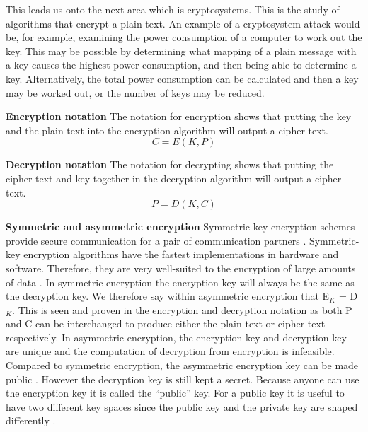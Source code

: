 \documentclass[11pt,a4paper, notitlepage]{report}
\begin{document}
This leads us onto the next area which is cryptosystems. This is the study of algorithms that encrypt a plain text. An example of a cryptosystem attack would be, for example, examining the power consumption of a computer to work out the key. This may be possible by determining what mapping of a plain message with a key causes the highest power consumption, and then being able to determine a key. Alternatively, the total power consumption can be calculated and then a key may be worked out, or the number of keys may be reduced.    \newline


\textbf{Encryption notation} \newline
The notation for encryption shows that putting the key and the plain text into the encryption algorithm will output a cipher text.
\begin{displaymath}
C = E (K, P)
\end{displaymath} \newline

\textbf{Decryption notation} \newline
The notation for decrypting shows that putting the cipher text and key together in the decryption algorithm will output a cipher text. 
\begin{displaymath}
P = D (K, C)
\end{displaymath} \newline

\textbf{Symmetric and asymmetric encryption} \newline
Symmetric-key encryption schemes provide secure communication for a pair of communication partners \cite{DBLP:series/isc/DelfsK07}. Symmetric-key encryption algorithms have the fastest implementations in hardware and software. Therefore, they are very well-suited to the encryption of large amounts of data \cite{DBLP:series/isc/DelfsK07}. In symmetric encryption the encryption key will always be the same as the decryption key. We therefore say within asymmetric encryption that E$_{K}$ = D$_{K}$. This is seen and proven in the encryption and decryption notation as both P and C can be interchanged to produce either the plain text or cipher text respectively. In asymmetric encryption, the encryption key and decryption key are unique and the computation of decryption from encryption is infeasible. Compared to symmetric encryption, the asymmetric encryption key can be made public \cite{DBLP:series/isc/DelfsK07}. However the decryption key is still kept a secret. Because anyone can use the encryption key it is called the “public” key. For a public key it is useful to have two different key spaces since the public key and the private key are shaped differently \cite{DBLP:series/isc/DelfsK07}.
\newline
\end{document}
